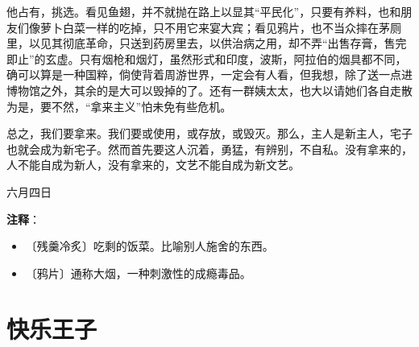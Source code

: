 \documentclass[12pt,UTF-8,openany]{ctexbook}
\begin{document}
\begin{large}
    他占有，挑选。看见鱼翅，并不就抛在路上以显其“平民化”，只要有养料，也和朋友们像萝卜白菜一样的吃掉，只不用它来宴大宾；看见鸦片，也不当众摔在茅厕里，以见其彻底革命，只送到药房里去，以供治病之用，却不弄“出售存膏，售完即止”的玄虚。只有烟枪和烟灯，虽然形式和印度，波斯，阿拉伯的烟具都不同，确可以算是一种国粹，倘使背着周游世界，一定会有人看，但我想，除了送一点进博物馆之外，其余的是大可以毁掉的了。还有一群姨太太，也大以请她们各自走散为是，要不然，“拿来主义”怕未免有些危机。
    
    总之，我们要拿来。我们要或使用，或存放，或毁灭。那么，主人是新主人，宅子也就会成为新宅子。然而首先要这人沉着，勇猛，有辨别，不自私。没有拿来的，人不能自成为新人，没有拿来的，文艺不能自成为新文艺。
    
    \hfill 六月四日
    
\end{large}


\newpage

\textbf{注释}：

\vspace{-1em}

\begin{itemize}
    \setlength\itemsep{-0.2em}
    \item 〔残羹冷炙〕吃剩的饭菜。比喻别人施舍的东西。
    \item 〔鸦片〕通称大烟，一种刺激性的成瘾毒品。
\end{itemize}

\chapter{快乐王子}
\end{document}

